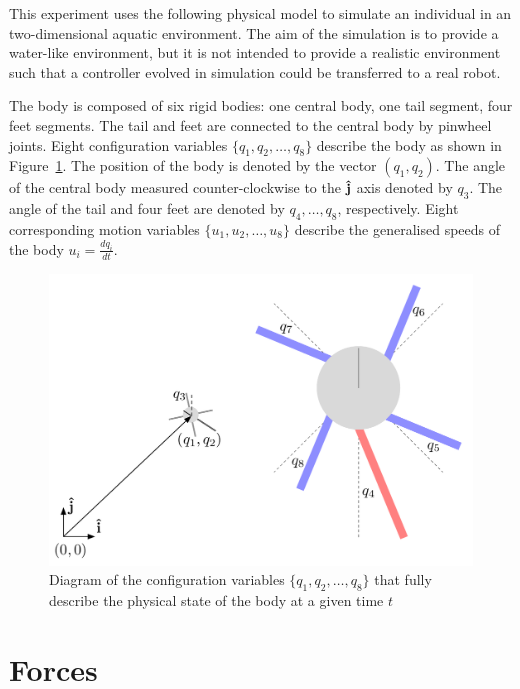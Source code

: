 This experiment uses the following physical model to simulate an
individual in an two-dimensional aquatic environment.  The aim of the
simulation is to provide a water-like environment, but it is not
intended to provide a realistic environment such that a controller
evolved in simulation could be transferred to a real
robot.  

The body is composed of six rigid bodies: one central body, one tail
segment, four feet segments.  The tail and feet are connected to the
central body by pinwheel joints.  Eight configuration variables
$\{q_1, q_2, \ldots, q_8\}$ describe the body as shown in
Figure~\ref{confvars}.  The position of the body is denoted by the
vector $(q_1, q_2)$.  The angle of the central body measured counter-clockwise
to the $\bf \hat j$ axis denoted by $q_3$.  The angle of the tail and
four feet are denoted by $q_4, \ldots, q_8$, respectively.  Eight
corresponding motion variables $\{u_1, u_2, \ldots, u_8\}$ describe
the generalised speeds of the body $u_i = \frac{d q_i}{d t}$.

\begin{figure}  
  \centering
  \includegraphics[scale=0.6]{fig/confvars.pdf} 
  \caption[Diagram of configuration variables]{\label{confvars}Diagram
    of the configuration variables $\{q_1, q_2, \ldots, q_8\}$ that
    fully describe the physical state of the body at a given time $t$}
\end{figure}

\section{Forces}

